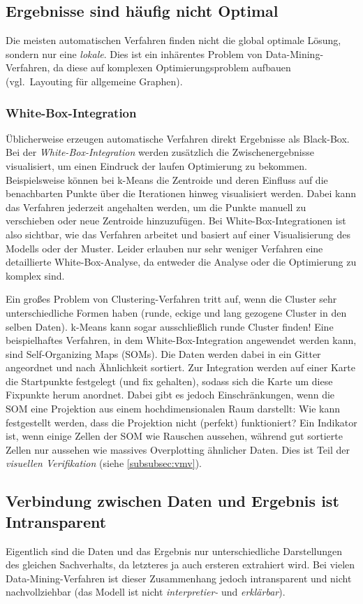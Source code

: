 		\subsection{Ergebnisse sind häufig nicht Optimal}
			Die meisten automatischen Verfahren finden nicht die global optimale Lösung, sondern nur eine \emph{lokale}. Dies ist ein inhärentes Problem von Data-Mining-Verfahren, da diese auf komplexen Optimierungsproblem aufbauen (vgl.~Layouting für allgemeine Graphen).

			\subsubsection{White-Box-Integration}
				Üblicherweise erzeugen automatische Verfahren direkt Ergebnisse als Black-Box. Bei der \emph{White-Box-Integration} werden zusätzlich die Zwischenergebnisse visualisiert, um einen Eindruck der laufen Optimierung zu bekommen. Beispielsweise können bei k-Means die Zentroide und deren Einfluss auf die benachbarten Punkte über die Iterationen hinweg visualisiert werden. Dabei kann das Verfahren jederzeit angehalten werden, um die Punkte manuell zu verschieben oder neue Zentroide hinzuzufügen. Bei White-Box-Integrationen ist also sichtbar, wie das Verfahren arbeitet und basiert auf einer Visualisierung des Modells oder der Muster. Leider erlauben nur sehr weniger Verfahren eine detaillierte White-Box-Analyse, da entweder die Analyse oder die Optimierung zu komplex sind.

				Ein großes Problem von Clustering-Verfahren tritt auf, wenn die Cluster sehr unterschiedliche Formen haben (\zB runde, eckige und lang gezogene Cluster in den selben Daten). k-Means kann sogar ausschließlich runde Cluster finden! Eine beispielhaftes Verfahren, in dem White-Box-Integration angewendet werden kann, sind Self-Organizing Maps (SOMs). Die Daten werden dabei in ein Gitter angeordnet und nach Ähnlichkeit sortiert. Zur Integration werden auf einer Karte die Startpunkte festgelegt (und fix gehalten), sodass sich die Karte um diese Fixpunkte herum anordnet. Dabei gibt es jedoch Einschränkungen, wenn die SOM eine Projektion aus einem hochdimensionalen Raum darstellt: Wie kann festgestellt werden, dass die Projektion nicht (perfekt) funktioniert? Ein Indikator ist, wenn einige Zellen der SOM wie Rauschen aussehen, während gut sortierte Zellen nur aussehen wie massives Overplotting ähnlicher Daten. Dies ist Teil der \emph{visuellen Verifikation} (siehe \autoref{subsubsec:vmv}).

		\subsection{Verbindung zwischen Daten und Ergebnis ist Intransparent}
			Eigentlich sind die Daten und das Ergebnis nur unterschiedliche Darstellungen des gleichen Sachverhalts, da letzteres ja auch ersteren extrahiert wird. Bei vielen Data-Mining-Verfahren ist dieser Zusammenhang jedoch intransparent und nicht nachvollziehbar (das Modell ist nicht \emph{interpretier-} und \emph{erklärbar}).

